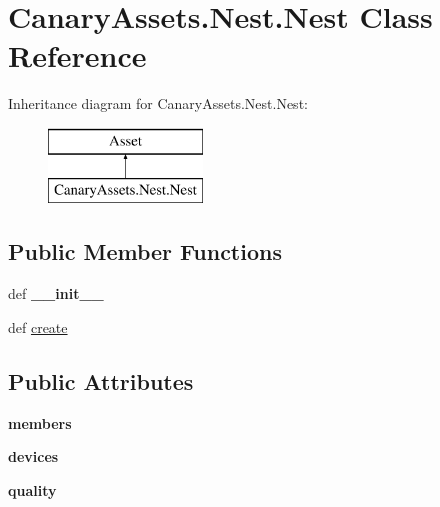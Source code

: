 \hypertarget{class_canary_assets_1_1_nest_1_1_nest}{\section{Canary\-Assets.\-Nest.\-Nest Class Reference}
\label{class_canary_assets_1_1_nest_1_1_nest}
}
Inheritance diagram for Canary\-Assets.\-Nest.\-Nest\-:\begin{figure}[H]
\begin{center}
\leavevmode
\includegraphics[height=2.000000cm]{class_canary_assets_1_1_nest_1_1_nest}
\end{center}
\end{figure}
\subsection*{Public Member Functions}
\begin{DoxyCompactItemize}
\item 
\hypertarget{class_canary_assets_1_1_nest_1_1_nest_a699269ce903225dca30cd976e4023e70}{def {\bfseries \-\_\-\-\_\-init\-\_\-\-\_\-}}\label{class_canary_assets_1_1_nest_1_1_nest_a699269ce903225dca30cd976e4023e70}

\item 
def \hyperlink{class_canary_assets_1_1_nest_1_1_nest_a557e617357bf28fcd96d31d980deeff9}{create}
\end{DoxyCompactItemize}
\subsection*{Public Attributes}
\begin{DoxyCompactItemize}
\item 
\hypertarget{class_canary_assets_1_1_nest_1_1_nest_aaf67343a84818206762d2578056b1f2a}{{\bfseries members}}\label{class_canary_assets_1_1_nest_1_1_nest_aaf67343a84818206762d2578056b1f2a}

\item 
\hypertarget{class_canary_assets_1_1_nest_1_1_nest_a9b1ae23c66abc485fb9f9d1402a0f5e2}{{\bfseries devices}}\label{class_canary_assets_1_1_nest_1_1_nest_a9b1ae23c66abc485fb9f9d1402a0f5e2}

\item 
\hypertarget{class_canary_assets_1_1_nest_1_1_nest_a03a0f34c05b34caa402609415dd7e12b}{{\bfseries quality}}\label{class_canary_assets_1_1_nest_1_1_nest_a03a0f34c05b34caa402609415dd7e12b}

\end{DoxyCompactItemize}


